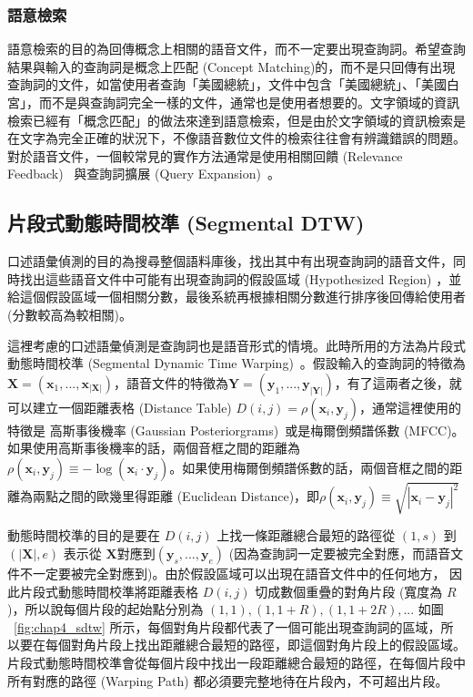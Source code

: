 \subsubsection{語意檢索}
語意檢索的目的為回傳概念上相關的語音文件，而不一定要出現查詢詞。希望查詢結果與輸入的查詢詞是概念上匹配
(Concept
Matching)的，而不是只回傳有出現查詢詞的文件，如當使用者查詢「美國總統」，文件中包含「美國總統」、「美國白宮」，而不是與查詢詞完全一樣的文件，通常也是使用者想要的。文字領域的資訊檢索已經有「概念匹配」的做法來達到語意檢索，但是由於文字領域的資訊檢索是在文字為完全正確的狀況下，不像語音數位文件的檢索往往會有辨識錯誤的問題。對於語音文件，一個較常見的實作方法通常是使用相關回饋
(Relevance Feedback)~\cite{ruthven2003survey} 與查詢詞擴展 (Query
Expansion)~\cite{voorhees1994query,xu1996query}。

\subsection{片段式動態時間校準 (Segmental DTW)}
\label{sec:chap4_sdtw}
口述語彙偵測的目的為搜尋整個語料庫後，找出其中有出現查詢詞的語音文件，同時找出這些語音文件中可能有出現查詢詞的假設區域 (Hypothesized Region) ，並給這個假設區域一個相關分數，最後系統再根據相關分數進行排序後回傳給使用者 (分數較高為較相關)。

這裡考慮的口述語彙偵測是查詢詞也是語音形式的情境。此時所用的方法為片段式動態時間校準 (Segmental Dynamic Time Warping)~\cite{chan2010unsupervised, hazen2009query}。假設輸入的查詢詞的特徵為$\mathbf{X} = (\mathbf{x}_1, ..., \mathbf{x}_{|\mathbf{X}|})$，語音文件的特徵為$\mathbf{Y} = (\mathbf{y}_1, ..., \mathbf{y}_{|\mathbf{Y}|})$，有了這兩者之後，就可以建立一個距離表格 (Distance Table) $D(i, j) = \rho(\mathbf{x}_i, \mathbf{y}_j)$，通常這裡使用的特徵是
高斯事後機率 (Gaussian Posteriorgrams)~\cite{zhang2009unsupervised}或是梅爾倒頻譜係數 (MFCC)。如果使用高斯事後機率的話，兩個音框之間的距離為 $\rho(\mathbf{x}_i, \mathbf{y}_j) \equiv -\log (\mathbf{x}_i \cdot \mathbf{y}_j)$。如果使用梅爾倒頻譜係數的話，兩個音框之間的距離為兩點之間的歐幾里得距離 (Euclidean Distance)，即$\rho(\mathbf{x}_i, \mathbf{y}_j) \equiv \sqrt{|\mathbf{x}_i - \mathbf{y}_j|^2}$

動態時間校準的目的是要在 $D(i, j)$ 上找一條距離總合最短的路徑從 $(1, s)$ 到 $(|\mathbf{X}|, e)$ 表示從 $\mathbf{X}$對應到$(\mathbf{y}_s, ..., \mathbf{y}_e)$ (因為查詢詞一定要被完全對應，而語音文件不一定要被完全對應到)。由於假設區域可以出現在語音文件中的任何地方， 因此片段式動態時間校準將距離表格 $D(i, j)$ 切成數個重疊的對角片段 (寬度為 $R$)，所以說每個片段的起始點分別為 $(1, 1), (1, 1+R), (1, 1+2R),...$ 如圖 ~\ref{fig:chap4_sdtw} 所示，每個對角片段都代表了一個可能出現查詢詞的區域，所以要在每個對角片段上找出距離總合最短的路徑，即這個對角片段上的假設區域。片段式動態時間校準會從每個片段中找出一段距離總合最短的路徑，在每個片段中所有對應的路徑 (Warping Path) 都必須要完整地待在片段內，不可超出片段。

